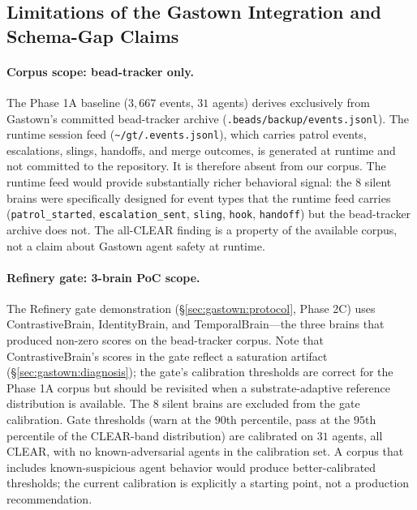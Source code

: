 %
%
%

\subsection{Limitations of the Gastown Integration and Schema-Gap Claims}
\label{sec:limitations_gastown}

\paragraph{Corpus scope: bead-tracker only.}
The Phase 1A baseline ($3{,}667$ events, $31$ agents) derives exclusively
from Gastown's committed bead-tracker archive
(\texttt{.beads/backup/events.jsonl}). The runtime session feed
(\texttt{\textasciitilde/gt/.events.jsonl}), which carries patrol events,
escalations, slings, handoffs, and merge outcomes, is generated at runtime
and not committed to the repository. It is therefore absent from our
corpus. The runtime feed would provide substantially richer behavioral
signal: the $8$ silent brains were specifically designed for event types
that the runtime feed carries (\texttt{patrol\_started},
\texttt{escalation\_sent}, \texttt{sling}, \texttt{hook},
\texttt{handoff}) but the bead-tracker archive does not. The all-CLEAR
finding is a property of the available corpus, not a claim about Gastown
agent safety at runtime.

\paragraph{Refinery gate: 3-brain PoC scope.}
The Refinery gate demonstration (\S\ref{sec:gastown:protocol}, Phase 2C)
uses ContrastiveBrain, IdentityBrain, and TemporalBrain---the three brains
that produced non-zero scores on the bead-tracker corpus. Note that
ContrastiveBrain's scores in the gate reflect a saturation artifact
(\S\ref{sec:gastown:diagnosis}); the gate's calibration thresholds are
correct for the Phase 1A corpus but should be revisited when a substrate-adaptive
reference distribution is available. The $8$ silent brains
are excluded from the gate calibration. Gate thresholds (warn at the
$90$th percentile, pass at the $95$th percentile of the CLEAR-band
distribution) are calibrated on $31$ agents, all CLEAR, with no
known-adversarial agents in the calibration set. A corpus that includes
known-suspicious agent behavior would produce better-calibrated thresholds;
the current calibration is explicitly a starting point, not a production
recommendation.

